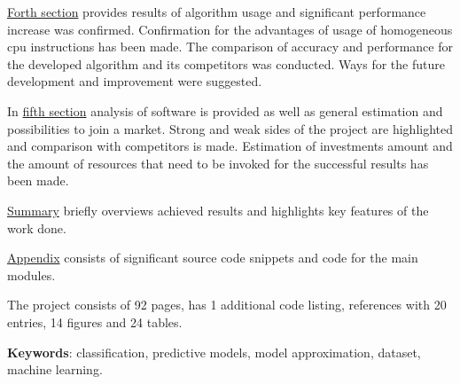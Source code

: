 \documentclass[a4paper,14pt]{extarticle}
\begin{document}
\underline{Forth section} provides results of algorithm usage and significant performance increase was confirmed. Confirmation for the advantages of usage of homogeneous cpu instructions has been made. The comparison of accuracy and performance for the developed algorithm and its competitors was conducted. Ways for the future development and improvement were suggested.

In \underline{fifth section} analysis of software is provided as well as general estimation and possibilities to join a market. Strong and weak sides of the project are highlighted and comparison with competitors is made. Estimation of investments amount and the amount of resources that need to be invoked for the successful results has been made.

\underline{Summary} briefly overviews achieved results and highlights key features of the work done.

\underline{Appendix} consists of significant source code snippets and code for the main modules.

The project consists of 92 pages, has 1 additional code listing, references with 20 entries, 14 figures and 24 tables.

\textbf{Keywords}: classification, predictive models, model approximation, dataset, machine learning.
\end{document}
